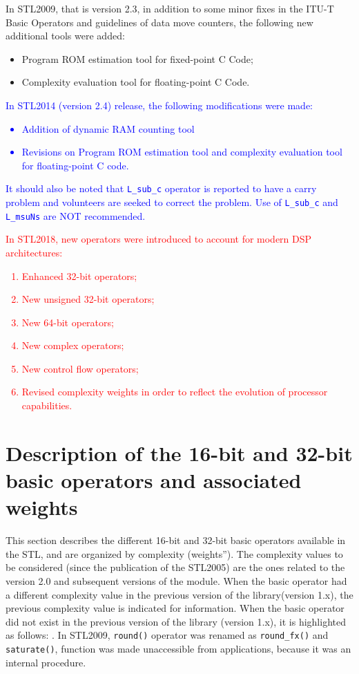 In STL2009, that is version 2.3, in addition to some minor fixes in the ITU-T Basic Operators and guidelines of data move counters, the following new additional tools were added:
\begin{itemize}
\item Program ROM estimation tool for fixed-point C Code;
\item Complexity evaluation tool for floating-point C Code.
\end{itemize}

\textcolor{blue}{
In STL2014 (version 2.4) release, the following modifications were made:
\begin{itemize}
\item Addition of dynamic RAM counting tool
\item Revisions on Program ROM estimation tool and complexity evaluation tool for floating-point C code.
\end{itemize}
It should also be noted that {\tt L\_sub\_c} operator is reported to have a carry problem and volunteers are seeked to correct the problem.
Use of {\tt L\_sub\_c} and {\tt L\_msuNs} are NOT recommended.
}

\textcolor{red}{
In STL2018, new operators were introduced to account for modern DSP architectures:
\begin{enumerate}
    \item Enhanced 32-bit operators;
    \item New unsigned 32-bit operators;
    \item New 64-bit operators;
    \item New complex operators;
    \item New control flow operators;
    \item Revised complexity weights in order to reflect the evolution of processor capabilities.
\end{enumerate}
}

\section{Description of the 16-bit and 32-bit basic operators and associated weights}

This section describes the different 16-bit and 32-bit basic operators available in the STL, and are organized by complexity (weights'').
The complexity values to be considered (since the publication of the STL2005) are the ones related to the version 2.0 and subsequent versions of the module.
When the basic operator had a different complexity value in the previous version of the library(version 1.x), the previous complexity value is indicated for information.
When the basic operator did not exist in the previous version of the library (version 1.x), it is highlighted as follows:
 . In STL2009, {\tt round()} operator was renamed as {\tt round\_fx()} and {\tt saturate()}, function was made unaccessible from applications, because it was an internal procedure.

